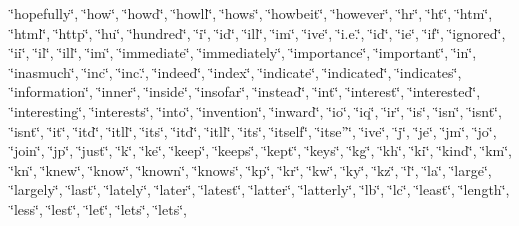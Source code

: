 \char`\"{}hopefully\char`\"{}, \char`\"{}how\char`\"{}, \char`\"{}how\textquotesingle{}d\char`\"{}, \char`\"{}how\textquotesingle{}ll\char`\"{}, \char`\"{}how\textquotesingle{}s\char`\"{}, \char`\"{}howbeit\char`\"{}, \char`\"{}however\char`\"{}, \char`\"{}hr\char`\"{}, \char`\"{}ht\char`\"{}, \char`\"{}htm\char`\"{}, \char`\"{}html\char`\"{}, \char`\"{}http\char`\"{}, \char`\"{}hu\char`\"{}, \char`\"{}hundred\char`\"{}, \char`\"{}i\char`\"{}, \char`\"{}i\textquotesingle{}d\char`\"{}, \char`\"{}i\textquotesingle{}ll\char`\"{}, \char`\"{}i\textquotesingle{}m\char`\"{}, \char`\"{}i\textquotesingle{}ve\char`\"{}, \char`\"{}i.\+e.\char`\"{}, \char`\"{}id\char`\"{}, \char`\"{}ie\char`\"{}, \char`\"{}if\char`\"{}, \char`\"{}ignored\char`\"{}, \char`\"{}ii\char`\"{}, \char`\"{}il\char`\"{}, \char`\"{}ill\char`\"{}, \char`\"{}im\char`\"{}, \char`\"{}immediate\char`\"{}, \char`\"{}immediately\char`\"{}, \char`\"{}importance\char`\"{}, \char`\"{}important\char`\"{}, \char`\"{}in\char`\"{}, \char`\"{}inasmuch\char`\"{}, \char`\"{}inc\char`\"{}, \char`\"{}inc.\char`\"{}, \char`\"{}indeed\char`\"{}, \char`\"{}index\char`\"{}, \char`\"{}indicate\char`\"{}, \char`\"{}indicated\char`\"{}, \char`\"{}indicates\char`\"{}, \char`\"{}information\char`\"{}, \char`\"{}inner\char`\"{}, \char`\"{}inside\char`\"{}, \char`\"{}insofar\char`\"{}, \char`\"{}instead\char`\"{}, \char`\"{}int\char`\"{}, \char`\"{}interest\char`\"{}, \char`\"{}interested\char`\"{}, \char`\"{}interesting\char`\"{}, \char`\"{}interests\char`\"{}, \char`\"{}into\char`\"{}, \char`\"{}invention\char`\"{}, \char`\"{}inward\char`\"{}, \char`\"{}io\char`\"{}, \char`\"{}iq\char`\"{}, \char`\"{}ir\char`\"{}, \char`\"{}is\char`\"{}, \char`\"{}isn\char`\"{}, \char`\"{}isn\textquotesingle{}t\char`\"{}, \char`\"{}isnt\char`\"{}, \char`\"{}it\char`\"{}, \char`\"{}it\textquotesingle{}d\char`\"{}, \char`\"{}it\textquotesingle{}ll\char`\"{}, \char`\"{}it\textquotesingle{}s\char`\"{}, \char`\"{}itd\char`\"{}, \char`\"{}itll\char`\"{}, \char`\"{}its\char`\"{}, \char`\"{}itself\char`\"{}, \char`\"{}itse”\char`\"{}, \char`\"{}ive\char`\"{}, \char`\"{}j\char`\"{}, \char`\"{}je\char`\"{}, \char`\"{}jm\char`\"{}, \char`\"{}jo\char`\"{}, \char`\"{}join\char`\"{}, \char`\"{}jp\char`\"{}, \char`\"{}just\char`\"{}, \char`\"{}k\char`\"{}, \char`\"{}ke\char`\"{}, \char`\"{}keep\char`\"{}, \char`\"{}keeps\char`\"{}, \char`\"{}kept\char`\"{}, \char`\"{}keys\char`\"{}, \char`\"{}kg\char`\"{}, \char`\"{}kh\char`\"{}, \char`\"{}ki\char`\"{}, \char`\"{}kind\char`\"{}, \char`\"{}km\char`\"{}, \char`\"{}kn\char`\"{}, \char`\"{}knew\char`\"{}, \char`\"{}know\char`\"{}, \char`\"{}known\char`\"{}, \char`\"{}knows\char`\"{}, \char`\"{}kp\char`\"{}, \char`\"{}kr\char`\"{}, \char`\"{}kw\char`\"{}, \char`\"{}ky\char`\"{}, \char`\"{}kz\char`\"{}, \char`\"{}l\char`\"{}, \char`\"{}la\char`\"{}, \char`\"{}large\char`\"{}, \char`\"{}largely\char`\"{}, \char`\"{}last\char`\"{}, \char`\"{}lately\char`\"{}, \char`\"{}later\char`\"{}, \char`\"{}latest\char`\"{}, \char`\"{}latter\char`\"{}, \char`\"{}latterly\char`\"{}, \char`\"{}lb\char`\"{}, \char`\"{}lc\char`\"{}, \char`\"{}least\char`\"{}, \char`\"{}length\char`\"{}, \char`\"{}less\char`\"{}, \char`\"{}lest\char`\"{}, \char`\"{}let\char`\"{}, \char`\"{}let\textquotesingle{}s\char`\"{}, \char`\"{}lets\char`\"{}, 